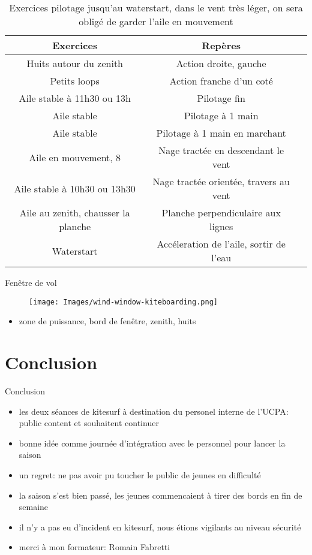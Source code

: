 \documentclass[10pt,a4paper]{beamer}
\begin{document}
\begin{frame}
\small{
\begin{table}
\begin{tabular}{|c|c|c|}
\hline
\textbf{Exercices}     &  \textbf{Repères}      \\
\hline 
Huits autour du zenith & Action droite, gauche   \\
\hline
Petits loops  & Action franche d'un coté  \\
\hline 
Aile stable à 11h30 ou 13h & Pilotage fin \\
\hline
Aile stable               & Pilotage à 1 main \\
\hline 
Aile stable               & Pilotage à 1 main en marchant \\
\hline
Aile en mouvement, 8      & Nage tractée en descendant le vent \\
\hline 
Aile stable à 10h30 ou 13h30   	& Nage tractée orientée, travers au vent \\
\hline
Aile au zenith, chausser la planche  & Planche perpendiculaire aux lignes \\
\hline
Waterstart                           &  Accéleration de l'aile, sortir de l'eau \\
\hline
\end{tabular}
\caption{Exercices pilotage jusqu'au waterstart, dans le vent très léger, on sera obligé de garder l'aile en mouvement}
\end{table}}
\end{frame}

\begin{frame}{Fen\^etre de vol}
\begin{figure}
\texttt{[image: Images/wind-window-kiteboarding.png]} 
\end{figure}
\begin{itemize}
\item zone de puissance, bord de fen\^etre, zenith, huits
\end{itemize}

\end{frame}

\section{Conclusion}
\begin{frame}{Conclusion}
\begin{itemize}
\item les deux séances de kitesurf à destination du personel interne de l'UCPA: public content et souhaitent continuer
\item bonne idée comme journée d'intégration avec le personnel pour lancer la saison
\item un regret: ne pas avoir pu toucher le public de jeunes en difficulté
\item la saison s'est bien passé, les jeunes commencaient à tirer des bords en fin de semaine
\item il n'y a pas eu d'incident en kitesurf, nous étions vigilants au niveau sécurité
\item merci à mon formateur: Romain Fabretti
\end{itemize}
\end{frame}
\end{document}
